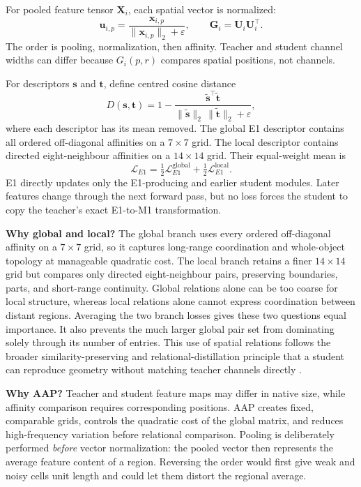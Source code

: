 For pooled feature tensor $\bm X_i$, each spatial vector is normalized:
\begin{equation}
    \bm u_{i,p}
    =\frac{\bm x_{i,p}}{\|\bm x_{i,p}\|_2+\varepsilon},
    \qquad
    \bm G_i=\bm U_i\bm U_i^\top.
\end{equation}
The order is pooling, normalization, then affinity. Teacher and student channel
widths can differ because $G_i(p,r)$ compares spatial positions, not channels.

For descriptors $\bm s$ and $\bm t$, define centred cosine distance
\begin{equation}
    D(\bm s,\bm t)
    =1-\frac{\widetilde{\bm s}^{\top}\widetilde{\bm t}}
    {\|\widetilde{\bm s}\|_2\,
     \|\widetilde{\bm t}\|_2+\varepsilon},
\end{equation}
where each descriptor has its mean removed. The global E1 descriptor contains
all ordered off-diagonal affinities on a $7\times7$ grid. The local descriptor
contains directed eight-neighbour affinities on a $14\times14$ grid. Their
equal-weight mean is
\begin{equation}
    \mathcal{L}_{E1}
    =\tfrac12\mathcal{L}_{E1}^{\mathrm{global}}
     +\tfrac12\mathcal{L}_{E1}^{\mathrm{local}}.
\end{equation}
E1 directly updates only the E1-producing and earlier student modules. Later
features change through the next forward pass, but no loss forces the student
to copy the teacher's exact E1-to-M1 transformation.

\textbf{Why global and local?} The global branch uses every ordered
off-diagonal affinity on a $7\times7$ grid, so it captures long-range
coordination and whole-object topology at manageable quadratic cost. The local
branch retains a finer $14\times14$ grid but compares only directed
eight-neighbour pairs, preserving boundaries, parts, and short-range
continuity. Global relations alone can be too coarse for local structure,
whereas local relations alone cannot express coordination between distant
regions. Averaging the two branch losses gives these two questions equal
importance. It also prevents the much larger global pair set from dominating
solely through its number of entries. This use of spatial relations follows the
broader similarity-preserving and relational-distillation principle that a
student can reproduce geometry without matching teacher channels directly
\cite{park2019rkd,tung2019similarity}.

\textbf{Why AAP?} Teacher and student feature maps may differ in native size,
while affinity comparison requires corresponding positions. AAP creates fixed,
comparable grids, controls the quadratic cost of the global matrix, and reduces
high-frequency variation before relational comparison. Pooling is deliberately
performed \emph{before} vector normalization: the pooled vector then represents
the average feature content of a region. Reversing the order would first give
weak and noisy cells unit length and could let them distort the regional
average.

